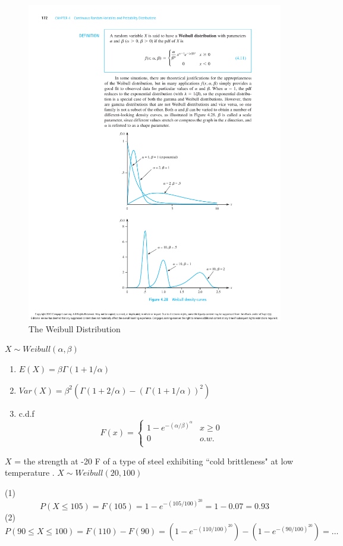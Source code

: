 \begin{figure}[htbp]
\centering
\includegraphics{figures/weibull_distribution.pdf}
\caption{The Weibull Distribution}
\end{figure}

\begin{prop}
 $X \sim Weibull(\alpha,\beta)$
\begin{enumerate}
\item $E(X)=\beta \Gamma(1+1/\alpha)$
\item $Var(X)=\beta^2\left(\Gamma(1+2/\alpha)-(\Gamma(1+1/\alpha))^2\right)$
\item c.d.f
\[F(x)=\begin{cases}
1-e^{-(\alpha/\beta)^{\alpha}} & x \geq 0 \\
0	&o.w. \\
\end{cases}\]
\end{enumerate}
\end{prop}

\begin{exmp}
$X$ = the strength at  -20 F of a type of steel exhibiting ``cold brittleness" at low temperature . $X \sim Weibull(20,100)$

(1) 
\[P(X \leq 105)=F(105)=1-e^{-(105/100)^{20}}=1-0.07=\boxed{0.93}\]
(2)
\[P(90 \leq X \leq 100)=F(110)-F(90)=\left(1-e^{-(110/100)^{20}}\right)-\left(1-e^{-(90/100)^{20}}\right)=\boxed{\dots}\] 
\end{exmp}

